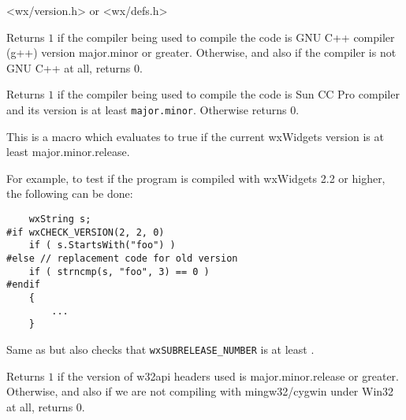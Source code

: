 <wx/version.h> or <wx/defs.h>


\label{wxcheckgccversion}


Returns $1$ if the compiler being used to compile the code is GNU C++
compiler (g++) version major.minor or greater. Otherwise, and also if
the compiler is not GNU C++ at all, returns $0$.


\label{wxchecksunccversion}


Returns $1$ if the compiler being used to compile the code is Sun CC Pro
compiler and its version is at least \texttt{major.minor}. Otherwise returns
$0$.


\label{wxcheckversion}


This is a macro which evaluates to true if the current wxWidgets version is at
least major.minor.release.

For example, to test if the program is compiled with wxWidgets 2.2 or higher,
the following can be done:

\begin{verbatim}
    wxString s;
#if wxCHECK_VERSION(2, 2, 0)
    if ( s.StartsWith("foo") )
#else // replacement code for old version
    if ( strncmp(s, "foo", 3) == 0 )
#endif
    {
        ...
    }
\end{verbatim}


\label{wxcheckversionfull}


Same as  but also checks that
\texttt{wxSUBRELEASE\_NUMBER} is at least .


\label{wxcheckw32apiversion}


Returns $1$ if the version of w32api headers used is major.minor.release or
greater. Otherwise, and also if we are not compiling with mingw32/cygwin under
Win32 at all, returns $0$.



